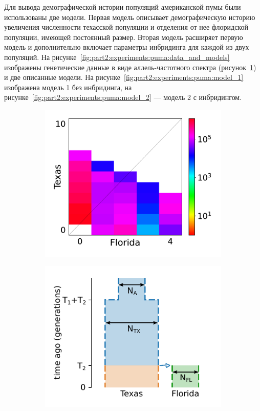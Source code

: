 Для вывода демографической истории популяций американской пумы были использованы две модели.
Первая модель описывает демографическую историю увеличения численности техасской популяции и отделения от нее флоридской популяции, имеющей постоянный размер.
Вторая модель расширяет первую модель и дополнительно включает параметры инбридинга для каждой из двух популяций.
На рисунке~\ref{fig:part2:experiments:puma:data_and_models} изображены генетические данные в виде аллель-частотного спектра (рисунок~\ref{fig:part2:experiments:puma:data}) и две описанные модели.
На рисунке~\ref{fig:part2:experiments:puma:model_1} изображена модель 1 без инбридинга, на рисунке~\ref{fig:part2:experiments:puma:model_2} --- модель 2 с инбридингом.

\begin{figure}[ht]
    \centering
    \begin{subfigure}[b]{.33\textwidth}
    \includegraphics[width=\textwidth]{images_experiments/puma/dadi_puma_sfs.pdf}
    \caption{}
    \label{fig:part2:experiments:puma:data}
    \end{subfigure}%
    \begin{subfigure}[b]{.33\textwidth}
    \includegraphics[width=\textwidth]{images_experiments/puma/picture_puma_model_1.pdf}

\end{subfigure}
\end{figure}
